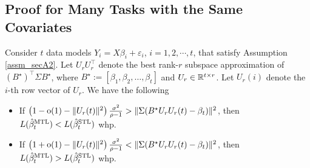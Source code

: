 \subsection{Proof for Many Tasks with the Same Covariates}\label{app_proof_many_tasks}


\begin{theorem}\label{thm_many_tasks}
	Consider $t$ data models $Y_i = X\beta_i + \varepsilon_i$, $i=1,2,\cdots, t$, that satisfy Assumption \ref{assm_secA2}.
	Let $U_r U_r^{\top}$ denote the best rank-$r$ subspace approximation of $(B^{\star})^\top\Sigma B^{\star}$, where $B^\star := [{\beta}_1,{\beta}_2,\dots,{\beta}_{t}]$ and $U_r\in\mathbb{R}^{t\times r}$.
	Let $U_r(i)$ denote the $i$-th row vector of $U_r$.
	We have the following 
	\begin{itemize}
		\item If $\left(1 -\operatorname{o}(1)- \|U_r(t)\|^2 \right)\frac{\sigma^2}{\rho - 1} > \|\Sigma (B^{\star} U_r U_r(t) - \beta_t)\|^2 $, then $L(\hat{\beta}_t^{\text{MTL}}) < L(\hat{\beta}_t^{\text{STL}})$ whp.
		\item If $\left(1 +\operatorname{o}(1)- \|U_r(t)\|^2\right)\frac{\sigma^2}{\rho - 1} < \|\Sigma(B^{\star} U_r U_r(t) - \beta_t)\|^2$, then $L(\hat{\beta}_t^{\text{MTL}}) > L(\hat{\beta}_t^{\text{STL}})$ whp.
	\end{itemize}
\end{theorem}




